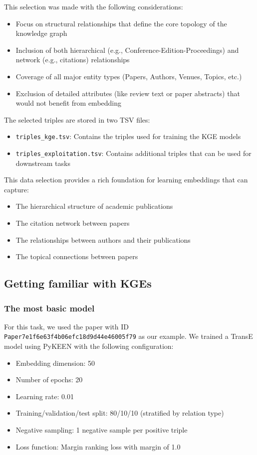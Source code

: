 \documentclass[10pt,a4paper]{article}
\begin{document}
This selection was made with the following considerations:
\begin{itemize}
    \item Focus on structural relationships that define the core topology of the knowledge graph
    \item Inclusion of both hierarchical (e.g., Conference-Edition-Proceedings) and network (e.g., citations) relationships
    \item Coverage of all major entity types (Papers, Authors, Venues, Topics, etc.)
    \item Exclusion of detailed attributes (like review text or paper abstracts) that would not benefit from embedding
\end{itemize}

The selected triples are stored in two TSV files:
\begin{itemize}
    \item \texttt{triples\_kge.tsv}: Contains the triples used for training the KGE models
    \item \texttt{triples\_exploitation.tsv}: Contains additional triples that can be used for downstream tasks
\end{itemize}

This data selection provides a rich foundation for learning embeddings that can capture:
\begin{itemize}
    \item The hierarchical structure of academic publications
    \item The citation network between papers
    \item The relationships between authors and their publications
    \item The topical connections between papers
\end{itemize}

\subsection{Getting familiar with KGEs}

\subsubsection{The most basic model}

For this task, we used the paper with ID \texttt{Paper7e1f6e63f4b06efc18d9d44e46005f79} as our example. We trained a TransE model using PyKEEN with the following configuration:
\begin{itemize}
    \item Embedding dimension: 50
    \item Number of epochs: 20
    \item Learning rate: 0.01
    \item Training/validation/test split: 80/10/10 (stratified by relation type)
    \item Negative sampling: 1 negative sample per positive triple
    \item Loss function: Margin ranking loss with margin of 1.0
\end{itemize}
\end{document}

